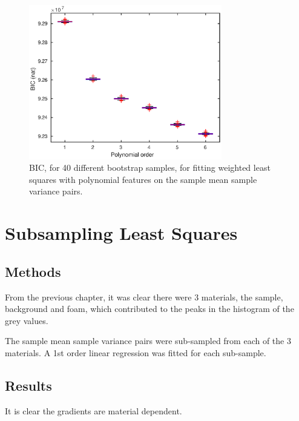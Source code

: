 \documentclass[12pt]{report}
\begin{document}
\begin{figure}
	\centering
	\includegraphics[width=0.75\textwidth]{figures/meanVar/polynomialBIC.eps}
	\caption{BIC, for 40 different bootstrap samples, for fitting weighted least squares with polynomial features on the sample mean sample variance pairs.}
	\label{fig:weightedLS_BIC}
\end{figure}

\section{Subsampling Least Squares}
\subsection{Methods}
From the previous chapter, it was clear there were 3 materials, the sample, background and foam, which contributed to the peaks in the histogram of the grey values.

The sample mean sample variance pairs were sub-sampled from each of the 3 materials. A 1st order linear regression was fitted for each sub-sample.

\subsection{Results}

It is clear the gradients are material dependent.
\end{document}

